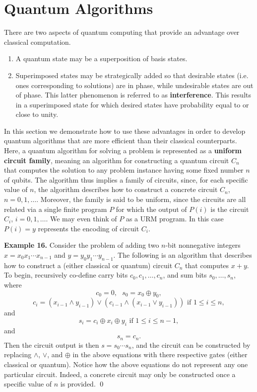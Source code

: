 \documentclass [12pt]{article}
\theoremstyle{definition}
\begin{document}
\newpage
\section*{Quantum Algorithms}

There are two aspects of quantum computing that provide an advantage over classical computation. 

\begin{enumerate}
\item A quantum state may be a superposition of basis states.
\item Superimposed states may be strategically added so that desirable states (i.e. ones corresponding to solutions) are in phase, while undesirable states 
are out of phase. This latter phenomenon is referred to as \textbf{interference}. This results in a superimposed state for which desired states have probability equal to or close to 
unity.
\end{enumerate}

In this section we demonstrate how to use these advantages in order to develop quantum algorithms that are more efficient than their classical counterparts. 
Here, a quantum algorithm for solving a problem is represented as a \textbf{uniform circuit family}, meaning an algorithm for constructing a quantum
circuit  $C_n$ that computes the solution to any problem instance having some fixed number $n$ of qubits. The  algorithm thus implies a family of circuits, since, for each specific
 value of
$n$, the algorithm describes how to construct a concrete circuit $C_n$, $n=0,1,\ldots$. Moreover, the family is said to be uniform, since the circuits are all related via a single
finite program $P$ for which the output of $P(i)$ is the circuit $C_i$, $i=0,1,\ldots$.  We may even think of $P$ as a URM program. In this case
 $P(i)=y$ represents the encoding of
circuit $C_i$. 

\newpage
\textbf{Example 16.} Consider the problem of adding two $n$-bit nonnegative integers $x=x_0x_1\cdots x_{n-1}$ and $y=y_0y_1\cdots y_{n-1}$. 
The following is an algorithm that describes how to construct a
(either classical or quantum) circuit
$C_n$ that computes $x+y$. To begin, recursively co-define carry bits $c_0,c_1,\ldots,c_{n}$, and sum bits $s_0,\ldots,s_{n}$, where 
\[c_0 = 0, \mbox{  } s_0 = x_0\oplus y_0,\]
\[c_i = (x_{i-1}\wedge y_{i-1}) \vee (c_{i-1}\wedge (x_{i-1}\vee y_{i-1})) \mbox{ if } 1\leq i\leq n,\]
and
\[s_i = c_{i} \oplus x_i \oplus y_i \mbox{ if } 1\leq i\leq n-1,\]
and
\[s_n = c_n.\]
Then the circuit output is then $s=s_0\cdots s_n$, and the circuit can be constructed by replacing $\wedge$, $\vee$, and $\oplus$ in the above equations with there
respective gates (either classical or quantum). Notice how the above equations do not represent any one particular circuit. Indeed, a concrete circuit may only be constructed once 
a specific value of $n$ is provided.
\qed
\end{document}
